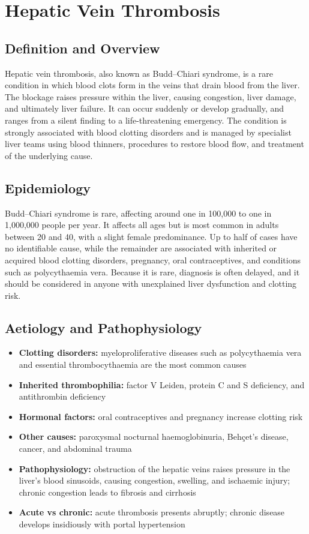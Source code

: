 \chapter{Hepatic Vein Thrombosis}

\section*{Definition and Overview}
Hepatic vein thrombosis, also known as Budd--Chiari syndrome, is a rare condition in which blood clots form in the veins that drain blood from the liver. The blockage raises pressure within the liver, causing congestion, liver damage, and ultimately liver failure. It can occur suddenly or develop gradually, and ranges from a silent finding to a life-threatening emergency. The condition is strongly associated with blood clotting disorders and is managed by specialist liver teams using blood thinners, procedures to restore blood flow, and treatment of the underlying cause.

\section*{Epidemiology}
Budd--Chiari syndrome is rare, affecting around one in 100,000 to one in 1,000,000 people per year. It affects all ages but is most common in adults between 20 and 40, with a slight female predominance. Up to half of cases have no identifiable cause, while the remainder are associated with inherited or acquired blood clotting disorders, pregnancy, oral contraceptives, and conditions such as polycythaemia vera. Because it is rare, diagnosis is often delayed, and it should be considered in anyone with unexplained liver dysfunction and clotting risk.

\section*{Aetiology and Pathophysiology}
\begin{itemize}
    \item \textbf{Clotting disorders:} myeloproliferative diseases such as polycythaemia vera and essential thrombocythaemia are the most common causes
    \item \textbf{Inherited thrombophilia:} factor V Leiden, protein C and S deficiency, and antithrombin deficiency
    \item \textbf{Hormonal factors:} oral contraceptives and pregnancy increase clotting risk
    \item \textbf{Other causes:} paroxysmal nocturnal haemoglobinuria, Behçet's disease, cancer, and abdominal trauma
    \item \textbf{Pathophysiology:} obstruction of the hepatic veins raises pressure in the liver's blood sinusoids, causing congestion, swelling, and ischaemic injury; chronic congestion leads to fibrosis and cirrhosis
    \item \textbf{Acute vs chronic:} acute thrombosis presents abruptly; chronic disease develops insidiously with portal hypertension
\end{itemize}


